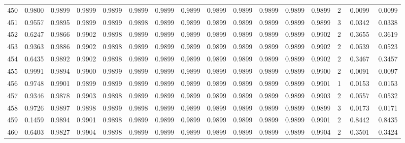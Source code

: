 \begin{tabular}{lrrrrrrrrrrrrrrr}
450 &      0.9800 &  0.9899 &  0.9899 &  0.9899 &  0.9899 &  0.9899 &  0.9899 &  0.9899 &  0.9899 &  0.9899 &   0.9899 &     0.9899 &      2 &                    0.0099 &                     0.0099 \\
451 &      0.9557 &  0.9895 &  0.9899 &  0.9899 &  0.9898 &  0.9899 &  0.9899 &  0.9899 &  0.9899 &  0.9899 &   0.9899 &     0.9899 &      3 &                    0.0342 &                     0.0338 \\
452 &      0.6247 &  0.9866 &  0.9902 &  0.9898 &  0.9899 &  0.9899 &  0.9899 &  0.9899 &  0.9899 &  0.9899 &   0.9899 &     0.9902 &      2 &                    0.3655 &                     0.3619 \\
453 &      0.9363 &  0.9886 &  0.9902 &  0.9898 &  0.9899 &  0.9899 &  0.9899 &  0.9899 &  0.9899 &  0.9899 &   0.9899 &     0.9902 &      2 &                    0.0539 &                     0.0523 \\
454 &      0.6435 &  0.9892 &  0.9902 &  0.9898 &  0.9899 &  0.9899 &  0.9899 &  0.9899 &  0.9899 &  0.9899 &   0.9899 &     0.9902 &      2 &                    0.3467 &                     0.3457 \\
455 &      0.9991 &  0.9894 &  0.9900 &  0.9899 &  0.9899 &  0.9899 &  0.9899 &  0.9899 &  0.9899 &  0.9899 &   0.9899 &     0.9900 &      2 &                   -0.0091 &                    -0.0097 \\
456 &      0.9748 &  0.9901 &  0.9899 &  0.9899 &  0.9899 &  0.9899 &  0.9899 &  0.9899 &  0.9899 &  0.9899 &   0.9899 &     0.9901 &      1 &                    0.0153 &                     0.0153 \\
457 &      0.9346 &  0.9878 &  0.9903 &  0.9898 &  0.9899 &  0.9899 &  0.9899 &  0.9899 &  0.9899 &  0.9899 &   0.9899 &     0.9903 &      2 &                    0.0557 &                     0.0532 \\
458 &      0.9726 &  0.9897 &  0.9898 &  0.9899 &  0.9898 &  0.9899 &  0.9899 &  0.9899 &  0.9899 &  0.9899 &   0.9899 &     0.9899 &      3 &                    0.0173 &                     0.0171 \\
459 &      0.1459 &  0.9894 &  0.9901 &  0.9898 &  0.9899 &  0.9899 &  0.9899 &  0.9899 &  0.9899 &  0.9899 &   0.9899 &     0.9901 &      2 &                    0.8442 &                     0.8435 \\
460 &      0.6403 &  0.9827 &  0.9904 &  0.9898 &  0.9899 &  0.9899 &  0.9899 &  0.9899 &  0.9899 &  0.9899 &   0.9899 &     0.9904 &      2 &                    0.3501 &                     0.3424 \\

\end{tabular}
